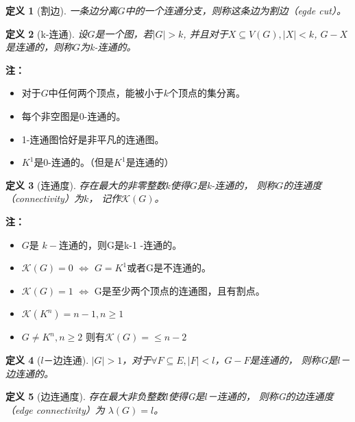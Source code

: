 \documentclass[UTF8]{ctexart}
\newtheorem{mydef}{定义}
\begin{document}
    \begin{mydef}[割边]
    一条边分离$G$中的一个连通分支，则称这条边为割边（egde cut）。
    \end{mydef}
    
    \begin{mydef}[k-连通]
    设$G$是一个图，若$|G|>k$, 并且对于$X \subseteq V(G), |X|<k $, $G-X$是连通的，则称$G$为k-连通的。
    \end{mydef}
    
    \textbf{注：}
    
    \begin{itemize}
    \item 对于$G$中任何两个顶点，能被小于$k$个顶点的集分离。
    \item 每个非空图是0-连通的。
    \item 1-连通图恰好是非平凡的连通图。
    \item $K^{1}$是0-连通的。（但是$K^{1}$是连通的）
    \end{itemize}
    
    
    \begin{mydef}[连通度]
    存在最大的非零整数$k$使得$G$是k-连通的，
    则称$G$的连通度（connectivity）为$k$，
    记作$\mathcal{K}(G)$。
    \end{mydef}
    
    \textbf{注：}
    \begin{itemize}
    
    \item $G$是 $k-$连通的，则G是k-1 -连通的。
    \item $\mathcal{K}(G)=0$  $\Longleftrightarrow$ $G=K^{1}$或者G是不连通的。
    \item $\mathcal{K}(G)=1$   $\Longleftrightarrow$ G是至少两个顶点的连通图，且有割点。
    \item $\mathcal{K}(K^{n})=n-1, n\geq 1$
    \item  $G \neq K^{n}, n\geq 2$ 则有$\mathcal{K}( G )= \leq n-2$
    
    \end{itemize}
    
     \begin{mydef}[$\mathit{l}$－边连通]
     $|G|>1$，对于$\forall F \subseteq E, |F| < \mathit{l} $，$G-F$是连通的，
     则称G是$ \mathit{l}$－边连通的。
     \end{mydef}
     
     \begin{mydef}[边连通度]
     存在最大非负整数$ \mathit{l} $使得G是$ \mathit{l} $－连通的，
     则称G的边连通度（edge connectivity）为 $\lambda(G)= \mathit{l}$。
     
    \end{mydef}
    
\end{document}
